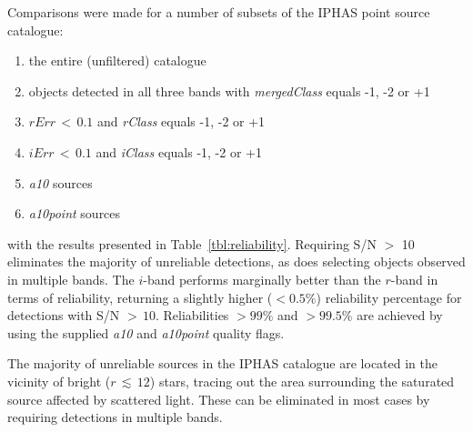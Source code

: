 \documentclass[a4paper,useAMS,usenatbib]{mn2e}
\begin{document}
{Comparisons were made for a number of subsets of the IPHAS point 
source catalogue: 
\begin{enumerate}
\item the entire (unfiltered) catalogue
\item objects detected in all three bands with \emph{mergedClass} equals -1, -2 or +1
\item $rErr\,<\,0.1$ and \emph{rClass} equals -1, -2 or +1
\item $iErr\,<\,0.1$ and \emph{iClass} equals -1, -2 or +1
\item \emph{a10} sources
\item \emph{a10point} sources
\end{enumerate}
\noindent with the results presented in Table~\ref{tbl:reliability}. 
Requiring S/N $>$ 10 eliminates the majority of unreliable detections, 
as does selecting objects observed in multiple bands. The $i$-band performs 
marginally better than the $r$-band in terms of reliability, returning a 
slightly higher ($< 0.5\%$) reliability percentage for detections with S/N 
$>\,10$. Reliabilities $>99\%$ and $>99.5\%$ are achieved by using the 
supplied \emph{a10} and \emph{a10point} quality flags.

The majority of unreliable sources in the IPHAS catalogue are 
located in the vicinity of bright ($r\,\lesssim\,12$) stars, tracing 
out the area surrounding the saturated source affected by scattered 
light. These can be eliminated in most cases by requiring detections 
in multiple bands.

}
\end{document}
